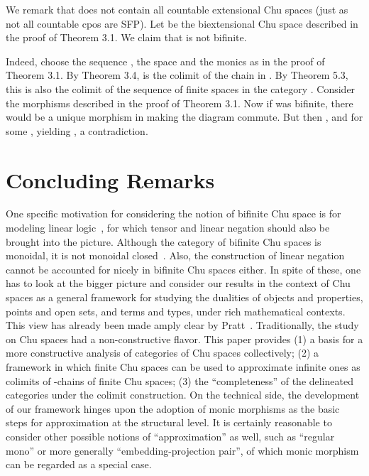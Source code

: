 \documentclass{LMCS}
\begin{document}
We remark that  does not contain all countable extensional Chu spaces
(just as not all countable cpos are SFP). 
Let  
be the biextensional Chu space
described in the proof of Theorem 3.1. We claim that
  is not bifinite. 

Indeed, choose the sequence , the
space  and the
monics  as in the proof of Theorem
3.1.  By Theorem 3.4,  is the colimit of the chain 
in .  By Theorem 5.3, this is also the colimit of the
sequence of finite spaces  in the category .  Consider the morphisms  described in the proof of Theorem 3.1.  Now if  was bifinite, there would be a unique morphism  in  making the diagram commute. But
then , and  for some , yielding , a contradiction. 

\section{Concluding Remarks}


\noindent One specific motivation for considering the notion of
bifinite Chu space is for modeling linear logic~\cite{lamarche0}, for
which tensor and linear negation should also be brought into the
picture.  Although the category of bifinite Chu spaces is monoidal, it
is not monoidal closed~\cite{huang}.  Also, the construction of linear
negation cannot be accounted for nicely in bifinite Chu spaces either.
In spite of these, one has to look at the bigger picture and consider
our results in the context of Chu spaces as a general framework for
studying the dualities of objects and properties, points and open
sets, and terms and types, under rich mathematical contexts. This view
has already been made amply clear by
Pratt~\cite{pratt1,pratt2,pratt3,pratt4,pratt5,pratt6,pratt7}.
Traditionally, the study on Chu spaces had a non-constructive
flavor. This paper provides (1) a basis for a more constructive
analysis of categories of Chu spaces collectively; (2) a framework in
which finite Chu spaces can be used to approximate infinite ones as
colimits of -chains of finite Chu spaces; (3) the
``completeness'' of the delineated categories under the colimit
construction.  On the technical side, the development of our framework
hinges upon the adoption of monic morphisms as the basic steps for
approximation at the structural level.  It is certainly reasonable to
consider other possible notions of ``approximation'' as well, such as
``regular mono'' or more generally ``embedding-projection pair'', of
which monic morphism can be regarded as a special case.
\end{document}
